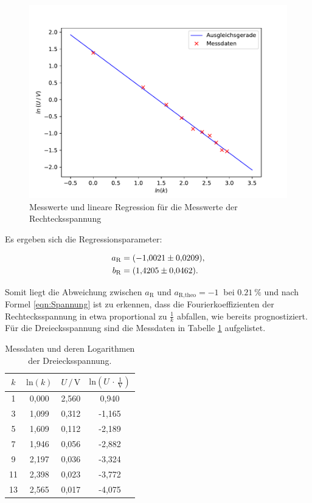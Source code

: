\begin{figure}[H]
    \centering
    \includegraphics[scale=1.0]{content/plot2.pdf}
    \caption{Messwerte und lineare Regression für die Messwerte der Rechtecksspannung}
    \label{fig:Recht}
\end{figure}

Es ergeben sich die Regressionsparameter:

\begin{align*}
    a_\text{R} &= \SI{-1.0021 \pm 0.0209}{}, \\
    b_\text{R} &= \SI{1.4205 \pm 0.0462}{}.
\end{align*}

Somit liegt die Abweichung zwischen $a_\text{R}$ und $a_\text{R,theo} = \SI{-1}{}$ bei $\SI{0.21}{\percent}$ und
nach Formel \eqref{eqn:Spannung} ist zu erkennen, dass die Fourierkoeffizienten der Rechtecksspannung in etwa
proportional zu $\frac{1}{k}$ abfallen, wie bereits prognostiziert.
\\
\newpage
Für die Dreiecksspannung sind die Messdaten in Tabelle \ref{tab:Messdaten3} aufgelistet.


\begin{table}[H]
    \centering
    \caption{Messdaten und deren Logarithmen der Dreiecksspannung.}
    \label{tab:Messdaten3}
    \begin{tabular}{c c c c}
    \toprule
    $k$ & $\text{ln} (k)$ & $U \,/\, \si{\volt}$ & $\text{ln}(U \,\cdot\, \frac{1}{\si{\volt}})$ \\
    \midrule
     1 & 0,000 & 2,560 &  0,940 \\
     3 & 1,099 & 0,312 & -1,165 \\
     5 & 1,609 & 0,112 & -2,189 \\
     7 & 1,946 & 0,056 & -2,882 \\
     9 & 2,197 & 0,036 & -3,324 \\
    11 & 2,398 & 0,023 & -3,772 \\
    13 & 2,565 & 0,017 & -4,075 \\
    \bottomrule
    \end{tabular}
\end{table} 

